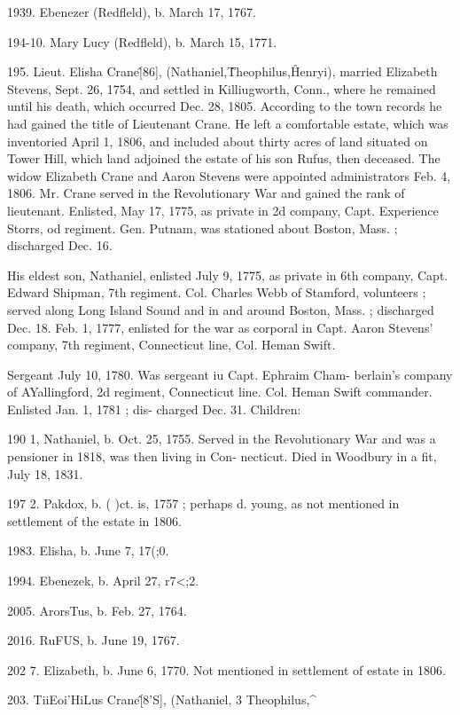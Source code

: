 1939. Ebenezer (Redfleld), b. March 17, 1767. 

194-10. Mary Lucy (Redfleld), b. March 15, 1771. 

195. Lieut. Elisha Crane\^ [86], (Nathaniel,\^ Theophilus,\^ 
Henryi), married Elizabeth Stevens, Sept. 26, 1754, and settled 
in Killiugworth, Conn., where he remained until his death, which 
occurred Dec. 28, 1805. According to the town records he had 
gained the title of Lieutenant Crane. He left a comfortable 
estate, which was inventoried April 1, 1806, and included about 
thirty acres of land situated on Tower Hill, which land adjoined 
the estate of his son Rufus, then deceased. The widow Elizabeth 
Crane and Aaron Stevens were appointed administrators Feb. 4, 
1806. Mr. Crane served in the Revolutionary War and gained 
the rank of lieutenant. Enlisted, May 17, 1775, as private in 2d 
company, Capt. Experience Storrs, od regiment. Gen. Putnam, 
was stationed about Boston, Mass. ; discharged Dec. 16. 

His eldest son, Nathaniel, enlisted July 9, 1775, as private in 
6th company, Capt. Edward Shipman, 7th regiment. Col. Charles 
Webb of Stamford, volunteers ; served along Long Island Sound 
and in and around Boston, Mass. ; discharged Dec. 18. Feb. 1, 
1777, enlisted for the war as corporal in Capt. Aaron Stevens' 
company, 7th regiment, Connecticut line, Col. Heman Swift. 




Sergeant July 10, 1780. Was sergeant iu Capt. Ephraim Cham- 
berlain's company of AYallingford, 2d regiment, Connecticut line. 
Col. Heman Swift commander. Enlisted Jan. 1, 1781 ; dis- 
charged Dec. 31. Children: 

190  1, Nathaniel, b. Oct. 25, 1755. Served in the Revolutionary 
War and was a pensioner in 1818, was then living in Con- 
necticut. Died in Woodbury in a fit, July 18, 1831. 

197  2. Pakdox, b. ( )ct. is, 1757 ; perhaps d. young, as not mentioned 
in settlement of the estate in 1806. 

1983. Elisha, b. June 7, 17(;0. 

1994. Ebenezek, b. April 27, r7<;2. 

2005. ArorsTus, b. Feb. 27, 1764. 

2016. RuFUS, b. June 19, 1767. 

202  7. Elizabeth, b. June 6, 1770. Not mentioned in settlement of 
estate in 1806. 

203. TiiEoi'HiLus Crane\^ [8'S], (Nathaniel, 3 Theophilus,\^ 

